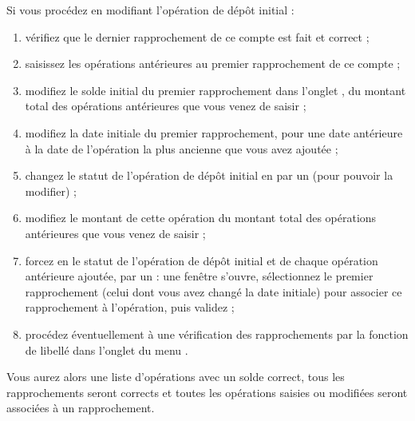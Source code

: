 Si vous procédez en modifiant l'opération de dépôt initial :
\begin{enumerate}
	\item vérifiez que le dernier rapprochement de ce compte est fait et correct ;
	\item saisissez les opérations antérieures au premier rapprochement de ce compte ;	
	\item modifiez le solde initial du premier rapprochement dans l'onglet , du montant total des opérations antérieures que vous venez de saisir ;
	\item modifiez la date initiale du premier rapprochement, pour une date antérieure à la date de l'opération la plus ancienne que vous avez ajoutée ;
	\item changez le statut de l'opération de dépôt initial en  par un  (pour pouvoir la modifier) ;
	\item modifiez le montant de cette opération du montant total des opérations antérieures que vous venez de saisir ;	
	\item forcez en  le statut de l'opération de dépôt initial et de chaque opération antérieure ajoutée, par un  : une fenêtre s'ouvre, sélectionnez le premier rapprochement (celui dont vous avez changé la date initiale) pour associer ce rapprochement à l'opération, puis validez ; 
	\item  procédez éventuellement à une vérification des rapprochements par la fonction de libellé  dans l'onglet  du menu .
\end{enumerate}

Vous aurez alors une liste d'opérations avec un solde correct, tous les rapprochements seront corrects et toutes les opérations saisies ou modifiées seront associées à un rapprochement.


